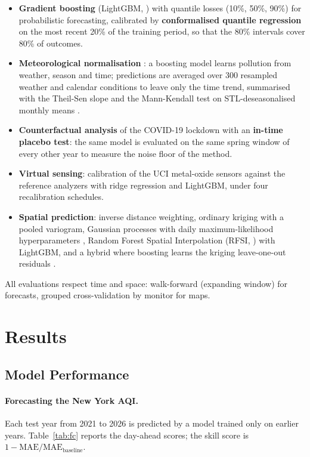 \documentclass[11pt]{article}
\begin{document}
\begin{itemize}
\item \textbf{Gradient boosting} (LightGBM, \citealp{ke2017}) with quantile losses (10\%, 50\%, 90\%) for probabilistic forecasting, calibrated by \textbf{conformalised quantile regression} \citep{romano2019} on the most recent 20\% of the training period, so that the 80\% intervals cover 80\% of outcomes.
\item \textbf{Meteorological normalisation} \citep{grange2019}: a boosting model learns pollution from weather, season and time; predictions are averaged over 300 resampled weather and calendar conditions to leave only the time trend, summarised with the Theil-Sen slope and the Mann-Kendall test \citep{sen1968} on STL-deseasonalised monthly means \citep{cleveland1990}.
\item \textbf{Counterfactual analysis} of the COVID-19 lockdown with an \textbf{in-time placebo test}: the same model is evaluated on the same spring window of every other year to measure the noise floor of the method.
\item \textbf{Virtual sensing}: calibration of the UCI metal-oxide sensors against the reference analyzers with ridge regression and LightGBM, under four recalibration schedules.
\item \textbf{Spatial prediction}: inverse distance weighting, ordinary kriging with a pooled variogram, Gaussian processes with daily maximum-likelihood hyperparameters \citep{rasmussen2006}, Random Forest Spatial Interpolation (RFSI, \citealp{sekulic2020}) with LightGBM, and a hybrid where boosting learns the kriging leave-one-out residuals \citep{dubrule1983}.
\end{itemize}
All evaluations respect time and space: walk-forward (expanding window) for forecasts, grouped cross-validation by monitor for maps.

\section{Results}

\subsection{Model Performance}

\paragraph{Forecasting the New York AQI.} Each test year from 2021 to 2026 is predicted by a model trained only on earlier years. Table~\ref{tab:fc} reports the day-ahead scores; the skill score is $1 - \text{MAE}/\text{MAE}_{\text{baseline}}$.
\end{document}
